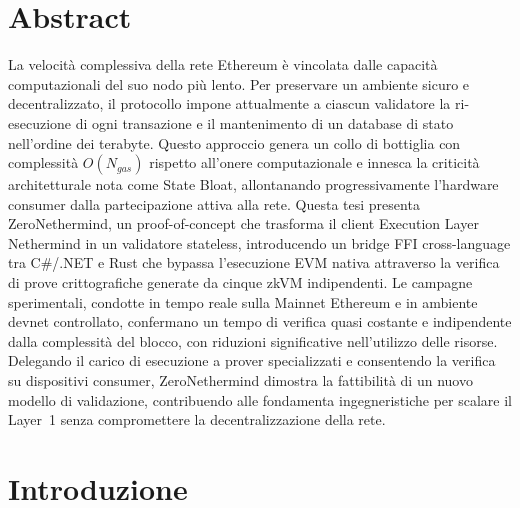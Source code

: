 \documentclass[12pt,a4paper,openright,twoside]{report}
\begin{document}


\large

\chapter*{Abstract}


La velocità complessiva della rete Ethereum è vincolata dalle capacità computazionali del suo nodo più lento. Per preservare un ambiente sicuro e decentralizzato, il protocollo impone attualmente a ciascun validatore la ri-esecuzione di ogni transazione e il mantenimento di un database di stato nell'ordine dei terabyte. Questo approccio genera un collo di bottiglia con complessità $O(N_{gas})$ rispetto all'onere computazionale e innesca la criticità architetturale nota come State Bloat, allontanando progressivamente l'hardware consumer dalla partecipazione attiva alla rete. Questa tesi presenta ZeroNethermind, un proof-of-concept che trasforma il client Execution Layer Nethermind in un validatore stateless, introducendo un bridge FFI cross-language tra C\#/.NET e Rust che bypassa l'esecuzione EVM nativa attraverso la verifica di prove crittografiche generate da cinque zkVM indipendenti. Le campagne sperimentali, condotte in tempo reale sulla Mainnet Ethereum e in ambiente devnet controllato, confermano un tempo di verifica quasi costante e indipendente dalla complessità del blocco, con riduzioni significative nell'utilizzo delle risorse. Delegando il carico di esecuzione a prover specializzati e consentendo la verifica su dispositivi consumer, ZeroNethermind dimostra la fattibilità di un nuovo modello di validazione, contribuendo alle fondamenta ingegneristiche per scalare il Layer~1 senza compromettere la decentralizzazione della rete.

\topmargin=-1cm
\tableofcontents
\thispagestyle{empty}
\newpage

\setcounter{chapter}{0}
\raggedbottom
\setcounter{page}{1}
\pagestyle{plain}


\chapter{Introduzione}\label{chap:introduzione}
\end{document}
